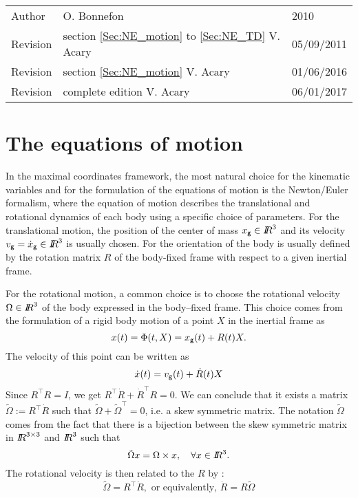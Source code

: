 


\begin{tabular}{lll}
  \centering
  Author &  O. Bonnefon &2010\\
  Revision& section \ref{Sec:NE_motion} to \ref{Sec:NE_TD} V. Acary&  05/09/2011\\
  Revision& section \ref{Sec:NE_motion}  V. Acary&  01/06/2016\\
  Revision& complete edition V. Acary&  06/01/2017\\

\end{tabular}

\def\glaw{\cdot}
\def\cg{\sf \small g}

\section{The equations of motion}


In the maximal coordinates framework, the most natural choice for the kinematic  variables and for the formulation of the equations of motion is the Newton/Euler formalism, where the equation of motion describes the translational and rotational dynamics of each body using a specific choice of parameters. For the translational motion, the position of the center of mass $x_{\cg}\in \RR^3$ and its velocity  $v_{\cg} = \dot x_{\cg} \in \RR^3$ is usually chosen. For the orientation of the body is usually defined by the rotation matrix $R$ of the body-fixed frame with respect to a given inertial frame.

For the rotational motion, a common choice is to choose the rotational velocity  $\Omega \in \mbox{\rm $I\!\!R$}^3$ of the body expressed in the body--fixed frame. This choice comes from the formulation of a rigid body motion of a point $X$ in the inertial frame as
\begin{equation}
  \label{eq:1}
  x(t) = \Phi(t,X) = x_{\cg}(t) + R(t) X.
\end{equation}
The velocity of this point can be written as
\begin{equation}
  \label{eq:2}
  \dot x(t) = v_{\cg}(t) + \dot R(t) X
\end{equation}
Since $R^\top R=I$, we get $R^\top \dot R + \dot R^\top R =0$. We can conclude that it exists a matrix $\tilde \Omega := R^\top \dot R $ such that $\tilde \Omega + \tilde \Omega^\top=0$, i.e. a skew symmetric matrix. The notation $\tilde \Omega$ comes from the fact that there is a bijection between the skew symmetric matrix in $\mbox{\rm $I\!\!R$}^{3\times3}$ and $\mbox{\rm $I\!\!R$}^3$ such that
\begin{equation}
  \label{eq:3}
  \tilde \Omega x  = \Omega \times x, \quad \forall x\in \mbox{\rm $I\!\!R$}^3.
\end{equation}
The rotational velocity is then related to the $R$ by :
\begin{equation}
  \label{eq:angularvelocity}
  \widetilde \Omega = R^\top \dot R, \text { or equivalently, } \dot R  = R \widetilde \Omega
\end{equation}

